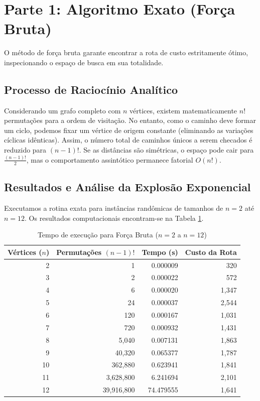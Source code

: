 \documentclass[12pt,a4paper]{article}
\begin{document}
\section{Parte 1: Algoritmo Exato (Força Bruta)}

O método de força bruta garante encontrar a rota de custo estritamente ótimo, inspecionando o espaço de busca em sua totalidade.

\subsection{Processo de Raciocínio Analítico}
Considerando um grafo completo com $n$ vértices, existem matematicamente $n!$ permutações para a ordem de visitação. No entanto, como o caminho deve formar um ciclo, podemos fixar um vértice de origem constante (eliminando as variações cíclicas idênticas). Assim, o número total de caminhos únicos a serem checados é reduzido para $(n-1)!$. Se as distâncias são simétricas, o espaço pode cair para $\frac{(n-1)!}{2}$, mas o comportamento assintótico permanece fatorial $O(n!)$.

\subsection{Resultados e Análise da Explosão Exponencial}

Executamos a rotina exata para instâncias randômicas de tamanhos de $n=2$ até $n=12$. Os resultados computacionais encontram-se na Tabela \ref{tab:forca-bruta}.

\begin{table}[H]
    \centering
    \caption{Tempo de execução para Força Bruta ($n=2$ a $n=12$)}
    \label{tab:forca-bruta}
    \begin{tabular}{@{}rrrr@{}}
    \toprule
    \textbf{Vértices ($n$)} & \textbf{Permutações $(n-1)!$} & \textbf{Tempo (s)} & \textbf{Custo da Rota} \\ \midrule
    2  & 1          & 0.000009  & 320   \\
    3  & 2          & 0.000022  & 572   \\
    4  & 6          & 0.000020  & 1,347 \\
    5  & 24         & 0.000037  & 2,544 \\
    6  & 120        & 0.000167  & 1,031 \\
    7  & 720        & 0.000932  & 1,431 \\
    8  & 5,040      & 0.007131  & 1,863 \\
    9  & 40,320     & 0.065377  & 1,787 \\
    10 & 362,880    & 0.623941  & 1,841 \\
    11 & 3,628,800  & 6.241694  & 2,101 \\
    12 & 39,916,800 & 74.479555 & 1,641 \\ \bottomrule
    \end{tabular}
\end{table}
\end{document}
